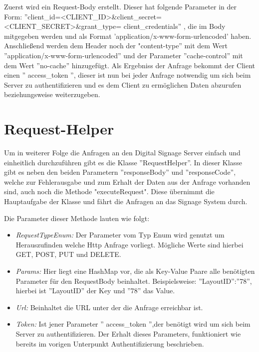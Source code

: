 Zuerst wird ein Request-Body erstellt. Dieser hat folgende Parameter in der Form: 
 ''client\_id=<CLIENT\_ID>\&client\_secret=<CLIENT\_SECRET>\&grant\_type=
 client\_credentials''
, die im Body mitgegeben werden und als Format 'application/x-www-form-urlencoded'  haben. Anschließend werden dem Header noch der "content-type'' mit dem Wert ''application/x-www-form-urlencoded'' und der Parameter ''cache-control'' mit dem Wert ''no-cache'' hinzugefügt. Als Ergebniss der Anfrage bekommt der Client einen '' access\_token '', dieser ist nun bei jeder Anfrage notwendig um sich beim Server zu authentifizieren und es dem Client zu ermöglichen Daten abzurufen beziehungsweise weiterzugeben.

\section{Request-Helper}
Um in weiterer Folge die Anfragen an den Digital Signage Server einfach und einheitlich durchzuführen gibt es die Klasse ''RequestHelper''. In dieser Klasse gibt es neben den beiden Parametern ''responseBody'' und ''responseCode'', welche zur Fehlerausgabe und zum Erhalt der Daten aus der Anfrage vorhanden sind, auch noch die Methode "executeRequest". Diese übernimmt die Hauptaufgabe der Klasse und fährt die Anfragen an das Signage System durch.

Die Parameter dieser Methode lauten wie folgt:

\begin{itemize}
	\item {\em RequestTypeEnum:} Der Parameter vom Typ Enum wird genutzt um Herauszufinden welche Http Anfrage vorliegt. Mögliche Werte sind hierbei GET, POST, PUT und DELETE.
	
	\item {\em Params:} Hier liegt eine HashMap vor, die als Key-Value Paare alle benötigten Parameter für den RequestBody beinhaltet. Beispielsweise: ''LayoutID'':''78'', hierbei ist ''LayoutID'' der Key und ''78'' das Value.
		
	\item {\em Url:} Beinhaltet die URL unter der die Anfrage erreichbar ist. 
	
	\item {\em Token:} Ist jener Parameter '' access\_token '',der benötigt wird um sich beim Server zu authentifizieren. Der Erhalt dieses Parameters, funktioniert wie bereits im vorigen Unterpunkt Authentifizierung beschrieben.
	
\end{itemize}

